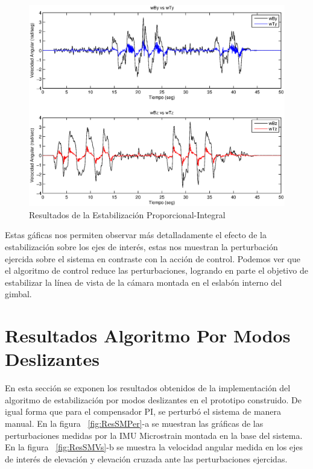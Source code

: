 \begin{figure}[H]
\centering \includegraphics[scale=0.63,trim = 20mm 0mm 20mm 0mm]{img/ResPIVs.eps}
      \caption{Resultados de la Estabilizaci\'{o}n Proporcional-Integral}
      \label{fig:ResPIVs}
\end{figure}

Estas g\'{a}ficas nos permiten observar m\'{a}s detalladamente el efecto de la estabilizaci\'{o}n sobre los ejes de inter\'{e}s, estas nos muestran la perturbaci\'{o}n ejercida sobre el sistema en contraste con la acci\'{o}n de control. Podemos ver que el algoritmo de control reduce las perturbaciones, logrando en parte el objetivo de estabilizar la l\'{i}nea de vista de la c\'{a}mara montada en el eslab\'{o}n interno del gimbal.

\section{Resultados Algoritmo Por Modos Deslizantes}

En esta secci\'{o}n se exponen los resultados obtenidos de la implementaci\'{o}n del algoritmo de estabilizaci\'{o}n por modos deslizantes en el prototipo construido. De igual forma que para el compensador PI, se perturb\'{o} el sistema de manera manual. En la figura ~\ref{fig:ResSMPer}-a se muestran las gr\'{a}ficas de las perturbaciones medidas por la IMU Microstrain montada en la base del sistema. En la figura ~\ref{fig:ResSMVs}-b se muestra la velocidad angular medida en los ejes de inter\'{e}s de elevaci\'{o}n y elevaci\'{o}n cruzada ante las perturbaciones ejercidas.   

